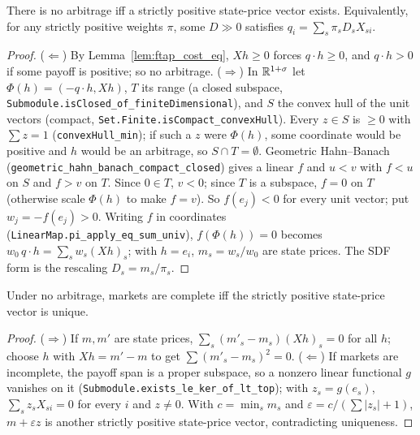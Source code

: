 \begin{theorem}
\label{thm:ftap}
\leanok
{}
There is no arbitrage iff a strictly positive state-price vector exists. Equivalently, for any strictly positive
weights $\pi$, some $D \gg 0$ satisfies $q_i = \sum_s \pi_sD_sX_{si}$.
\end{theorem}
\begin{proof}
\leanok
($\Leftarrow$) By Lemma~\ref{lem:ftap_cost_eq}, $Xh \ge 0$ forces $q\cdot h \ge 0$, and $q\cdot h > 0$ if some payoff is
positive; so no arbitrage. ($\Rightarrow$) In $\mathbb{R}^{1+\sigma}$ let $\Phi(h) = (-q\cdot h, Xh)$, $T$ its range (a
closed subspace, \texttt{Submodule.isClosed\_of\_finiteDimensional}), and $S$ the convex hull of the unit vectors
(compact, \texttt{Set.Finite.isCompact\_convexHull}). Every $z \in S$ is $\ge 0$ with $\sum z = 1$
(\texttt{convexHull\_min}); if such a $z$ were $\Phi(h)$, some coordinate would be positive and $h$ would be an arbitrage,
so $S \cap T = \emptyset$. Geometric Hahn--Banach (\texttt{geometric\_hahn\_banach\_compact\_closed}) gives a linear $f$
and $u < v$ with $f < u$ on $S$ and $f > v$ on $T$. Since $0 \in T$, $v < 0$; since $T$ is a subspace, $f = 0$ on $T$
(otherwise scale $\Phi(h)$ to make $f = v$). So $f(e_j) < 0$ for every unit vector; put $w_j = -f(e_j) > 0$. Writing
$f$ in coordinates (\texttt{LinearMap.pi\_apply\_eq\_sum\_univ}), $f(\Phi(h)) = 0$ becomes
$w_0\,q\cdot h = \sum_s w_s(Xh)_s$; with $h = e_i$, $m_s = w_s/w_0$ are state prices. The SDF form is the rescaling
$D_s = m_s/\pi_s$.
\end{proof}

\begin{theorem}
\label{thm:ftap_complete}
\leanok
{}
Under no arbitrage, markets are complete iff the strictly positive state-price vector is unique.
\end{theorem}
\begin{proof}
\leanok
($\Rightarrow$) If $m, m'$ are state prices, $\sum_s(m'_s - m_s)(Xh)_s = 0$ for all $h$; choose $h$ with $Xh = m' - m$
to get $\sum(m'_s - m_s)^2 = 0$. ($\Leftarrow$) If markets are incomplete, the payoff span is a proper subspace, so a
nonzero linear functional $g$ vanishes on it (\texttt{Submodule.exists\_le\_ker\_of\_lt\_top}); with $z_s = g(e_s)$,
$\sum_s z_sX_{si} = 0$ for every $i$ and $z \ne 0$. With $c = \min_s m_s$ and $\varepsilon = c/(\sum|z_s| + 1)$,
$m + \varepsilon z$ is another strictly positive state-price vector, contradicting uniqueness.
\end{proof}

